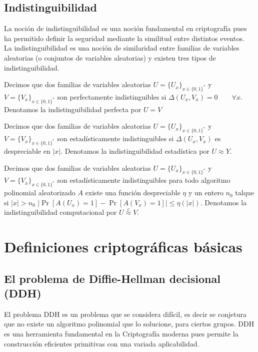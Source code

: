 \subsection{Indistinguibilidad}
La noción de indistinguibilidad es una noción fundamental en criptografía
pues ha permitido definir la seguridad mediante la similitud entre distintos
eventos.\\
La indistinguibilidad es una noción
de similaridad entre familias de variables aleatorias (o conjuntos
de variables aleatorias) y existen tres tipos de indistinguibilidad.

\begin{definicion}
Decimos que dos familias de variables aleatorias $U=\{U_x\}_{x\in\{0,1\}^*}$
y $V=\{V_x\}_{x\in\{0,1\}^*}$ son perfectamente indistinguibles
si $\Delta(U_x, V_x) = 0 \qquad \forall x$.
Denotamos la indistinguibilidad perfecta por $U = V$
\end{definicion}

\begin{definicion}
Decimos que dos familias de variables aleatorias $U=\{U_x\}_{x\in\{0,1\}^*}$ y 
$V=\{V_x\}_{x\in\{0,1\}^*}$ son estadísticamente indistinguibles
si $\Delta(U_x, V_x)$ es despreciable en $|x|$. Denotamos la indistinguibilidad estadística
por $U \approx Y$.
\end{definicion}

\begin{definicion}
Decimos que dos familias de variables aleatorias $U=\{U_x\}_{x\in\{0,1\}^*}$ y
$V=\{V_x\}_{x\in\{0,1\}^*}$ son estadísticamente indistinguibles
para todo algoritmo polinomial aleatorizado $A$ existe una función despreciable
$\eta$ y un entero $n_0$ talque si $|x| > n_0$
$|\Pr[A(U_x)=1] - \Pr[A(V_x)=1]| \leq \eta(|x|)$. Denotamos la indistinguibilidad
computacional por $U \overset{c}{\approx} V$.
\end{definicion}

\section{Definiciones criptográficas básicas}

\subsection{El problema de Diffie-Hellman decisional (DDH)}
El problema DDH \cite{diffie-hellman_me:1976a} es un problema que se considera
difícil, es decir se conjetura
que no existe un algoritmo polinomial que lo solucione, para ciertos
grupos. DDH es una herramienta fundamental en la Criptografía moderna pues
permite la construcción eficientes primitivas con una variada aplicabilidad.

